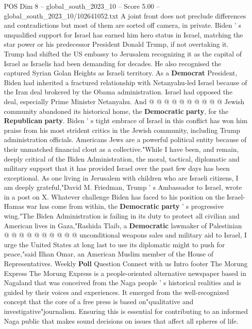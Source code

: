 \begin{textsample}{POS Dim 8 – global\_south\_2023\_10 – Score 5.00 – global\_south\_2023\_10/102641052.txt}
A joint front does not preclude differences and contradictions but most of them are sorted off camera, in private.
Biden ' s unqualified support for Israel has earned him hero status in Israel, matching the star power or his predecessor President Donald Trump, if not overtaking it.
Trump had shifted the US embassy to Jerusalem recognizing it as the capital of Israel as Israelis had been demanding for decades.
He also recognised the captured Syrian Golan Heights as Israeli territory.
As a \textbf{Democrat} President, Biden had inherited a fractured relationship with Netanyahu-led Israel because of the Iran deal brokered by the Obama administration.
Israel had opposed the deal, especially Prime Minister Netanyahu.
And @ @ @ @ @ @ @ @ @ @ Jewish community abandoned its historical home, the \textbf{Democratic} \textbf{party}, for the \textbf{Republican} \textbf{party}.
Biden ' s tight embrace of Israel in this conflict has won him praise from his most strident critics in the Jewish community, including Trump administration officials.
Americans Jews are a powerful political entity because of their unmatched financial clout as a collective."While I have been, and remain, deeply critical of the Biden Administration, the moral, tactical, diplomatic and military support that it has provided Israel over the past few days has been exceptional.
As one living in Jerusalem with children who are Israeli citizens, I am deeply grateful,"David M.
Friedman, Trump ' s Ambassador to Israel, wrote in a post on X.
Whatever challenge Biden has faced to his position on the Israel-Hamas war has come from within, the \textbf{Democratic} \textbf{party} ' s progressive wing."The Biden Administration is failing in its duty to protect all civilian and American lives in Gaza,"Rashida Tlaib, a \textbf{Democratic} lawmaker of Palestinian @ @ @ @ @ @ @ @ @ @ unconditional weapons sales and military aid to Israel, I urge the United States at long last to use its diplomatic might to push for peace,"said Ilhan Omar, an American Muslim member of the House of Representatives.
Weekly \textbf{Poll} Question Connect with us Intro footer The Morung Express The Morung Express is a people-oriented alternative newspaper based in Nagaland that was conceived from the Naga people ' s historical realities and is guided by their voices and experiences.
It emerged from the well-recognized concept that the core of a free press is based on"qualitative and investigative"journalism.
Ensuring this is essential for contributing to an informed Naga public that makes sound decisions on issues that affect all spheres of life.

\end{textsample}
